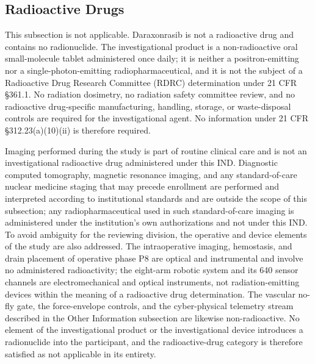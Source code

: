 
\subsection{Radioactive Drugs}

This subsection is not applicable. Daraxonrasib is not a radioactive drug and
contains no radionuclide. The investigational product is a non-radioactive oral
small-molecule tablet administered once daily; it is neither a positron-emitting
nor a single-photon-emitting radiopharmaceutical, and it is not the subject of a
Radioactive Drug Research Committee (RDRC) determination under 21 CFR \S 361.1. No
radiation dosimetry, no radiation safety committee review, and no radioactive
drug-specific manufacturing, handling, storage, or waste-disposal controls are
required for the investigational agent. No information under 21 CFR
\S 312.23(a)(10)(ii) is therefore required.

Imaging performed during the study is part of routine clinical care and is not an
investigational radioactive drug administered under this IND. Diagnostic computed
tomography, magnetic resonance imaging, and any standard-of-care nuclear medicine
staging that may precede enrollment are performed and interpreted according to
institutional standards and are outside the scope of this subsection; any
radiopharmaceutical used in such standard-of-care imaging is administered under the
institution's own authorizations and not under this IND. To avoid ambiguity for the
reviewing division, the operative and device elements of the study are also
addressed. The intraoperative imaging, hemostasis, and drain placement of operative
phase P8 are optical and instrumental and involve no administered radioactivity; the
eight-arm robotic system and its 640 sensor channels are electromechanical and
optical instruments, not radiation-emitting devices within the meaning of a
radioactive drug determination. The vascular no-fly gate, the force-envelope
controls, and the cyber-physical telemetry stream described in the Other Information
subsection are likewise non-radioactive. No element of the investigational
product or the investigational device introduces a radionuclide into the
participant, and the radioactive-drug category is therefore satisfied as not
applicable in its entirety.

